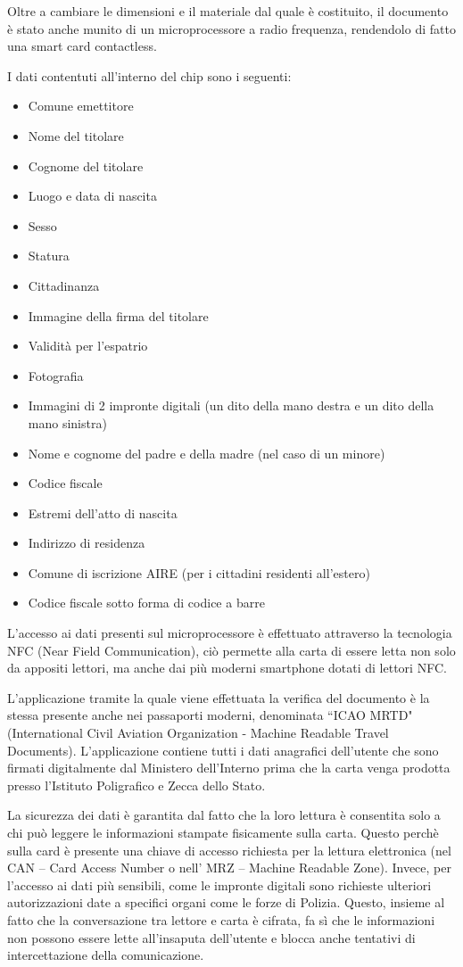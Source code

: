 Oltre a cambiare le dimensioni e il materiale dal quale è costituito, il documento è stato anche munito di un microprocessore a radio frequenza, rendendolo di fatto una smart card contactless.

I dati contentuti all'interno del chip sono i seguenti:
\begin{itemize}
    \item Comune emettitore
    \item Nome del titolare
    \item Cognome del titolare
    \item Luogo e data di nascita
    \item Sesso
    \item Statura
    \item Cittadinanza
    \item Immagine della firma del titolare
    \item Validità per l’espatrio
    \item Fotografia
    \item Immagini di 2 impronte digitali (un dito della mano destra e un dito della mano sinistra)
    \item Nome e cognome del padre e della madre (nel caso di un minore)
    \item Codice fiscale
    \item Estremi dell’atto di nascita
    \item Indirizzo di residenza
    \item Comune di iscrizione AIRE (per i cittadini residenti all’estero)
    \item Codice fiscale sotto forma di codice a barre
\end{itemize}

L'accesso ai dati presenti sul microprocessore è effettuato attraverso la tecnologia NFC  (Near Field Communication), ciò permette alla carta di essere letta non solo da appositi lettori, ma anche dai più moderni smartphone dotati di lettori NFC.

L'applicazione tramite la quale viene effettuata la verifica del documento è la stessa presente anche nei passaporti moderni, denominata ``ICAO MRTD" (International Civil Aviation Organization - Machine Readable Travel Documents). L'applicazione contiene tutti i dati anagrafici dell'utente che sono firmati digitalmente dal Ministero dell’Interno prima che la carta venga prodotta presso l’Istituto Poligrafico e Zecca dello Stato.

La sicurezza dei dati è garantita dal fatto che la loro lettura è consentita solo a chi può leggere le informazioni stampate fisicamente sulla carta. Questo perchè sulla card è presente una chiave di accesso richiesta per la lettura elettronica (nel CAN – Card Access Number o nell’ MRZ – Machine Readable Zone). Invece, per l'accesso ai dati più sensibili, come le impronte digitali sono richieste ulteriori autorizzazioni date a specifici organi come le forze di Polizia. Questo, insieme al fatto che la conversazione tra lettore e carta è cifrata, fa sì che le informazioni non possono essere lette all'insaputa dell'utente e blocca anche tentativi di intercettazione della comunicazione.
\cite{cie}

